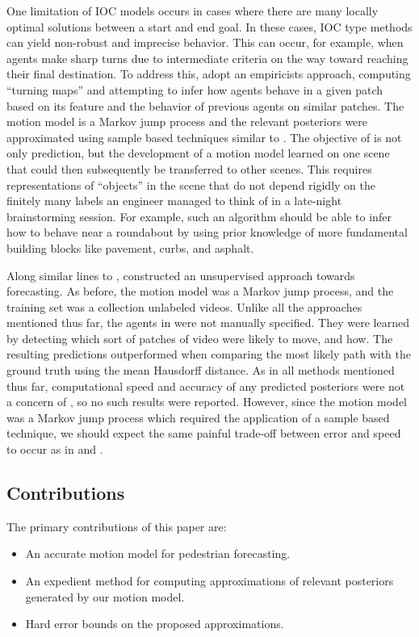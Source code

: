 \documentclass[letterpaper,10pt,conference]{ieeeconf}
\begin{document}
One limitation of IOC models occurs in cases where there are many locally optimal solutions between a start and end goal.
In these cases, IOC type methods can yield non-robust and imprecise behavior.
This can occur, for example, when agents make sharp turns due to intermediate criteria on the way toward reaching their final destination.
To address this, \cite{Ballan2016} adopt an empiricists approach, computing ``turning maps'' and attempting to infer how agents behave in a given patch based on its feature and the behavior of previous agents on similar patches.
The motion model is a Markov jump process and the relevant posteriors were approximated using sample based techniques similar to \cite{Karasev2016}.
The objective of \cite{Ballan2016} is not only prediction, but the development of a motion model learned on one scene that could then subsequently be transferred to other scenes. 
This requires representations of ``objects'' in the scene that do not depend rigidly on the finitely many labels an engineer managed to think of in a late-night brainstorming session.
For example, such an algorithm should be able to infer how to behave near a roundabout by using prior knowledge of more fundamental building blocks like pavement, curbs, and asphalt.

Along similar lines to \cite{Ballan2016}, \cite{Walker2014} constructed an unsupervised approach towards forecasting.
As before, the motion model was a Markov jump process, and the training set was a collection unlabeled videos.
Unlike all the approaches mentioned thus far, the agents in \cite{Walker2014} were not manually specified.
They were learned by detecting which sort of patches of video were likely to move, and how.
The resulting predictions outperformed \cite{Kitani2012} when comparing the most likely path with the ground truth using the mean Hausdorff distance.
As in all methods mentioned thus far, computational speed and accuracy of any predicted posteriors were not a concern of \cite{Walker2014}, so no such results were reported.
However, since the motion model was a Markov jump process which required the application of a sample based technique, we should expect the same painful trade-off between error and speed to occur as in \cite{Karasev2016} and \cite{Ballan2016}.

\subsection{Contributions}

The primary contributions of this paper are:
\begin{itemize}
	\item An accurate motion model for pedestrian forecasting.
	\item An expedient method for computing approximations of relevant posteriors generated by our motion model.
	\item Hard error bounds on the proposed approximations.
\end{itemize}
\end{document}
